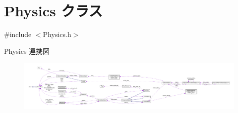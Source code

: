 \hypertarget{class_physics}{}\section{Physics クラス}
\label{class_physics}


{\ttfamily \#include $<$Physics.\+h$>$}



Physics 連携図\nopagebreak
\begin{figure}[H]
\begin{center}
\leavevmode
\includegraphics[width=350pt]{class_physics__coll__graph}
\end{center}
\end{figure}
